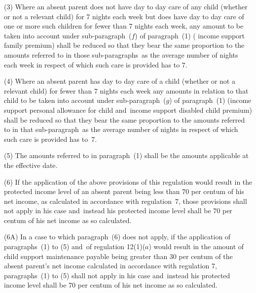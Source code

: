 \documentclass[12pt,a4paper]{article}
\begin{document}
(3) Where an absent parent does not have day to day care of any child (whether or not a relevant child) for 7 nights each week but does have day to day care of one or more such children for fewer than 7 nights each week, 
any amount  %
to be taken into account under 
sub-paragraph~($f$)  %
of paragraph~(1) (%
income support family premium) shall be reduced so that they bear the same proportion to the amounts referred to in those sub-paragraphs~as the average number of nights each week in respect of which such care is provided has to 7.

(4) Where an absent parent has day to day care of a child (whether or not a relevant child) for fewer than 7 nights each week any amounts in relation to that child to be taken into account under sub-paragraph~($g$) of paragraph~(1) (income support personal allowance for child and~income support disabled child premium) shall be reduced so that they bear the same proportion to the amounts referred to in that sub-paragraph~as the average number of nights in respect of which such care is provided has to~7.

(5) The amounts referred to in paragraph~(1) shall be the amounts applicable at the effective date.

(6) If the application of the above provisions of this regulation would result in the protected income level of an absent parent being less than 70 per centum of his net income, as calculated in accordance with regulation~7, those provisions shall not apply in his case and~instead his protected income level shall be 70 per centum of his net income as so calculated.

(6A) In a case to which paragraph~(6) does not apply, if the application of paragraphs~(1) to (5) and~of regulation 12(1)($a$) would result in the amount of child support maintenance payable being greater than 30 per centum of the absent parent’s net income calculated in accordance with regulation 7, paragraphs~(1) to (5) shall not apply in his case and~instead his protected income level shall be 70 per centum of his net income as so calculated.
\end{document}
